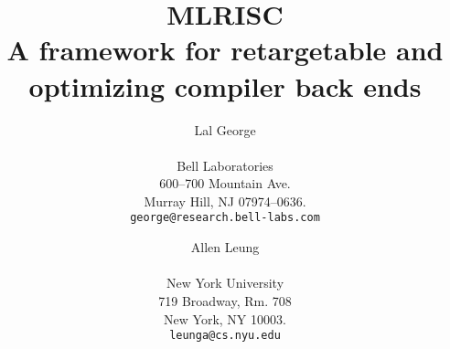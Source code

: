 \usepackage{mltex}
\usepackage{wrapfig}
\usepackage{float}
\usepackage{alltt}
\usepackage{fancyheadings}
\usepackage{utopia}

   \setlength{\textwidth}{6.5in}
   \setlength{\evensidemargin}{0in}
   \setlength{\oddsidemargin}{0in}
   \setlength{\textheight}{8in}
   \setlength{\topmargin}{-0.5in}

   \pagestyle{fancyplain}

   \newcommand{\edge}[1]{\rightarrow_{#1}}
   \newcommand{\union}{\cup}
   \newcommand{\Union}{\bigcup}
   \newcommand{\overrides}{overrides}
   \newcommand{\defas}{\stackrel{\rm as}{=}}

   \renewcommand{\sectionmark}[1]{\markright{\thesection\ #1}}
   \renewcommand{\subsectionmark}[1]{\markright{\thesubsection\ #1}}
   \newcommand{\Term}[1]{\mbox{\it #1}}
   \lhead[\fancyplain{}{\bfseries\thepage}]%
         {\fancyplain{}{\bfseries\rightmark}}
   \rhead[\fancyplain{}{\bfseries\leftmark}]%
         {\fancyplain{}{\bfseries\thepage}}
   \cfoot{}

   \newenvironment{Figure}{\begin{figure}[htbp]}{\end{figure}}


   \title{\bf \LARGE MLRISC \\ \large A framework for retargetable and optimizing compiler back ends}  
   \author{\begin{tabular}{c}
            Lal George \\ \\
            Bell Laboratories \\
            600--700 Mountain Ave. \\
            Murray Hill, NJ 07974--0636. \\
            {\tt george@research.bell-labs.com}
            \end{tabular}
          \and 
          \begin{tabular}{c}
            Allen Leung \\ \\
            New York University \\
            719 Broadway, Rm. 708 \\ 
            New York, NY 10003. \\
            {\tt leunga@cs.nyu.edu}
           \end{tabular}
        }

